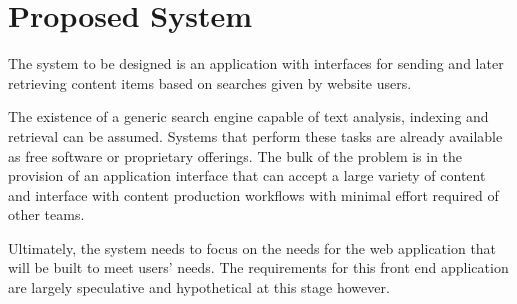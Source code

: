 \section{Proposed System}

The system to be designed is an application with interfaces for sending
and later retrieving content items based on searches given by website users.

The existence of a generic search engine capable of text analysis, indexing
and retrieval can be assumed. Systems that perform these tasks are
already available as free software or proprietary offerings. The bulk of
the problem is in the provision of an application interface that can
accept a large variety of content and interface with content production
workflows with minimal effort required of other teams.

Ultimately, the system needs to focus on the needs for the web application
that will be built to meet users' needs. The requirements
for this front end application are largely speculative and hypothetical
at this stage however.
